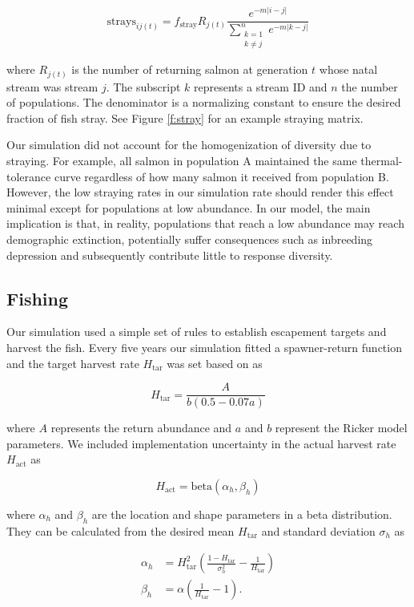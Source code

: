 \[\mathrm{strays}_{ij(t)} = f_{\mathrm{stray}} R_{j(t)}
    \frac{e^{-m \lvert i-j \rvert }}
      {\displaystyle\sum\limits_{
        \substack{k = 1 \\ k \neq j}}^{n} 
        e^{-m \lvert k-j \rvert }}\]

\noindent where $R_{j(t)}$ is the number of returning salmon at generation $t$ whose natal stream was stream $j$. The subscript $k$ represents a stream ID and $n$ the number of populations. The denominator is a normalizing constant to ensure the desired fraction of fish stray. See Figure \ref{f:stray} for an example straying matrix.

Our simulation did not account for the homogenization of diversity due to straying. For example, all salmon in population A maintained the same thermal-tolerance curve regardless of how many salmon it received from population B. However, the low straying rates in our simulation rate should render this effect minimal except for populations at low abundance. In our model, the main implication is that, in reality, populations that reach a low abundance may reach demographic extinction, potentially suffer consequences such as inbreeding depression \citep{wang2002} and subsequently contribute little to response diversity.

\subsection{Fishing}

Our simulation used a simple set of rules to establish escapement targets and harvest the fish. Every five years our simulation fitted a spawner-return function and the target harvest rate $H_{\mathrm{tar}}$ was set based on \citet{hilborn1992} as

\[H_{\mathrm{tar}} = \frac{A}{b (0.5 - 0.07a)}
  \label{eq:esc}\]

\noindent where $A$ represents the return abundance and $a$ and $b$ represent the Ricker model parameters. We included implementation uncertainty in the actual harvest rate $H_{\mathrm{act}}$ as

\[H_{\mathrm{act}} = \mathrm{beta}(\alpha_h, \beta_h)\]

\noindent where $\alpha_h$ and $\beta_h$ are the location and shape parameters in a beta distribution. They can be calculated from the desired mean $H_{\mathrm{tar}}$ and standard deviation $\sigma_h$ as \citep[p.~97]{morgan1990}

\[\begin{aligned}
  \alpha_h &= H_{\mathrm{tar}}^2
                \left(
                \frac{1 - H_{\mathrm{tar}}}{\sigma_h^2} - \frac{1}{H_{\mathrm{tar}}}
                \right)\\
   \beta_h &= \alpha \left({\frac{1}{H_{\mathrm{tar}}} - 1}\right).\end{aligned}\]

